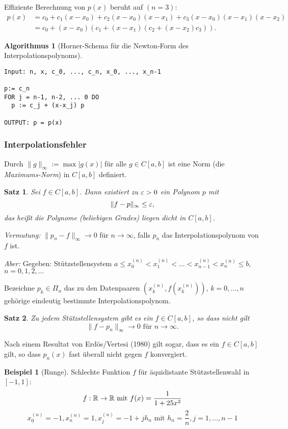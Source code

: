 \documentclass[
 a4paper,
 12pt,
 parskip=half
 ]{scrartcl}
\numberwithin{equation}{section}
\theoremstyle{plain}
\newtheorem{thm}{Satz}[section] %
\theoremstyle{definition}
\newtheorem{exmp}{Beispiel}[section] %
\newtheorem{algn}{Algorithmus}[section] %
\numberwithin{equation}{section}
\begin{document}
Effiziente Berechnung von $p(x)$ beruht auf $(n=3)$:
\begin{align*}
 p(x) &= c_0 + c_1 (x-x_0) + c_2 (x-x_0)(x-x_1) + c_3 (x-x_0)(x-x_1)(x-x_2) \\
      &= c_0 + (x-x_0) ( c_1 + (x-x_1) ( c_2 + (x-x_2) c_3 ) ).
\end{align*}

\begin{algn}[Horner-Schema für die Newton-Form des Interpolationspolynoms]
\begin{lstlisting}
Input: n, x, c_0, ..., c_n, x_0, ..., x_n-1

p:= c_n
FOR j = n-1, n-2, ... 0 DO
  p := c_j + (x-x_j) p
  
OUTPUT: p = p(x)
\end{lstlisting}
\end{algn}

\subsubsection{Interpolationsfehler}
Durch $\| g \|_\infty := \max | g(x) |$ für alle $g \in C[a,b]$ ist eine Norm (die \emph{Maximums-Norm}) in $C[a,b]$ definiert.

\begin{thm}
 Sei $f \in C[a,b]$. Dann existiert zu $\varepsilon > 0$ ein Polynom $p$ mit
 \[ \| f-p \|_\infty \le \varepsilon, \]
 das heißt die Polynome (beliebigen Grades) liegen dicht in $C[a,b]$.
\end{thm}

\emph{Vermutung:} $\| p_n - f \|_\infty \to 0$ für $n \to \infty$, falls $p_n$ das Interpolationspolynom von $f$ ist. 

\emph{Aber:} Gegeben: Stützstellensystem $a \le x_0^{(n)} < x_1^{(n)} < \ldots < x_{n-1}^{(n)} < x_n^{(n)} \le b$, $n = 0, 1, 2, \ldots$

Bezeichne $p_k \in \Pi_n$ das zu den Datenpaaren $(x_k^{(n)}, f(x_k^{(n)}))$, $k = 0, \ldots, n$ gehörige eindeutig bestimmte Interpolationspolynom.

\begin{thm}
 Zu jedem Stützstellensystem gibt es ein $f \in C[a,b]$, so dass \emph{nicht} gilt
 \[ \| f-p_n \|_\infty \to 0 \text{ für } n \to \infty. \]
\end{thm}

Nach einem Resultat von Erdös/Vertesi (1980) gilt sogar, dass es ein $f \in C[a,b]$ gilt, so dass $p_n(x)$ fast überall nicht gegen $f$ konvergiert.

\begin{exmp}[Runge]
 Schlechte Funktion $f$ für äquidistante Stützstellenwahl in $[-1,1]$:
 \[ f: \mathbb{R} \to \mathbb{R} \text{ mit } f(x) = \frac{1}{1 + 25 x^2} \]
 \[ x_0^{(n)} = -1, x_n^{(n)} = 1, x_j^{(n)} = -1 + j h_n \text{ mit } h_n = \frac{2}{n}, j = 1, \ldots, n-1 \]
\end{exmp}
\end{document}
